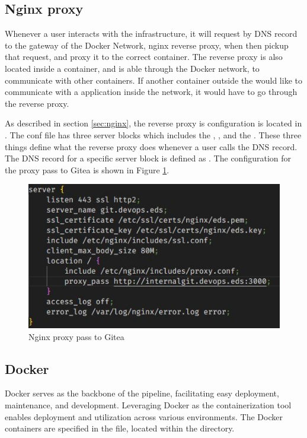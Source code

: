 \subsection{Nginx proxy}
\label{sec:pipeline-local-nginx}

Whenever a user interacts with the infrastructure, it will 
request by \ac{DNS} record to the gateway of the Docker Network, nginx reverse proxy, when then pickup that request, and 
proxy it to the correct container. The reverse proxy is also located inside a container, and is able through the Docker network,
to communicate with other containers. If another container outside the 
would like to communicate with a application inside the network, it would have to
go through the reverse proxy.

As described in section \ref{sec:nginx}, the reverse proxy is configuration is located in .
The conf file has three server blocks which includes the , , and the .
These three things define what the reverse proxy does whenever a user calls the DNS record. The \ac{DNS} record for a 
specific server block is defined as . The configuration for the proxy pass to Gitea is shown in Figure \ref{fig:nginx-proxy-pass}.

\begin{figure}[h]
    \centering
    \includegraphics[scale=.7]{images/git_proxy_pass.jpg}
    \caption{Nginx proxy pass to Gitea}
    \label{fig:nginx-proxy-pass}
\end{figure}

\subsection{Docker}
\label{sec:pipeline-local-docker}
Docker serves as the backbone of the pipeline, facilitating easy deployment, maintenance, and development. 
Leveraging Docker as the containerization tool enables deployment and utilization across various environments. 
The Docker containers are specified in the  file, located within the  directory.

